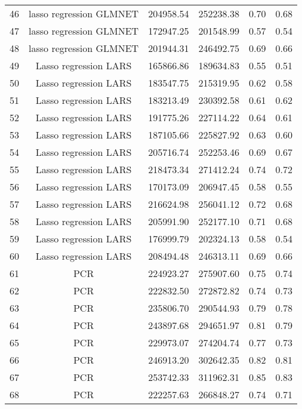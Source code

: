 \begin{tabular}{cccccc}
  46 & lasso regression GLMNET & 204958.54 & 252238.38 & 0.70 & 0.68 \\ 
  47 & lasso regression GLMNET & 172947.25 & 201548.99 & 0.57 & 0.54 \\ 
  48 & lasso regression GLMNET & 201944.31 & 246492.75 & 0.69 & 0.66 \\ 
  49 & Lasso regression LARS & 165866.86 & 189634.83 & 0.55 & 0.51 \\ 
  50 & Lasso regression LARS & 183547.75 & 215319.95 & 0.62 & 0.58 \\ 
  51 & Lasso regression LARS & 183213.49 & 230392.58 & 0.61 & 0.62 \\ 
  52 & Lasso regression LARS & 191775.26 & 227114.22 & 0.64 & 0.61 \\ 
  53 & Lasso regression LARS & 187105.66 & 225827.92 & 0.63 & 0.60 \\ 
  54 & Lasso regression LARS & 205716.74 & 252253.46 & 0.69 & 0.67 \\ 
  55 & Lasso regression LARS & 218473.34 & 271412.24 & 0.74 & 0.72 \\ 
  56 & Lasso regression LARS & 170173.09 & 206947.45 & 0.58 & 0.55 \\ 
  57 & Lasso regression LARS & 216624.98 & 256041.12 & 0.72 & 0.68 \\ 
  58 & Lasso regression LARS & 205991.90 & 252177.10 & 0.71 & 0.68 \\ 
  59 & Lasso regression LARS & 176999.79 & 202324.13 & 0.58 & 0.54 \\ 
  60 & Lasso regression LARS & 208494.48 & 246313.11 & 0.69 & 0.66 \\ 
  61 & PCR & 224923.27 & 275907.60 & 0.75 & 0.74 \\ 
  62 & PCR & 222832.50 & 272872.82 & 0.74 & 0.73 \\ 
  63 & PCR & 235806.70 & 290544.93 & 0.79 & 0.78 \\ 
  64 & PCR & 243897.68 & 294651.97 & 0.81 & 0.79 \\ 
  65 & PCR & 229973.07 & 274204.74 & 0.77 & 0.73 \\ 
  66 & PCR & 246913.20 & 302642.35 & 0.82 & 0.81 \\ 
  67 & PCR & 253742.33 & 311962.31 & 0.85 & 0.83 \\ 
  68 & PCR & 222257.63 & 266848.27 & 0.74 & 0.71 \\ 
   \hline
\end{tabular}
